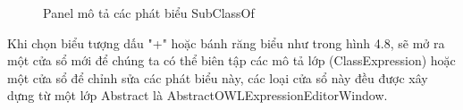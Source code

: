 \begin{figure}[h!]
	\centering
	\caption{Panel mô tả các phát biểu SubClassOf\label{overflow}}
\end{figure}
Khi chọn biểu tượng dấu "+" hoặc bánh răng biểu như trong hình 4.8, sẽ mở ra một cửa sổ mới để chúng ta có thể biên tập các mô tả lớp (ClassExpression) hoặc một cửa sổ để chỉnh sửa các phát biểu này, các loại cửa sổ này đều được xây dựng từ một lớp Abstract là AbstractOWLExpressionEditorWindow.
